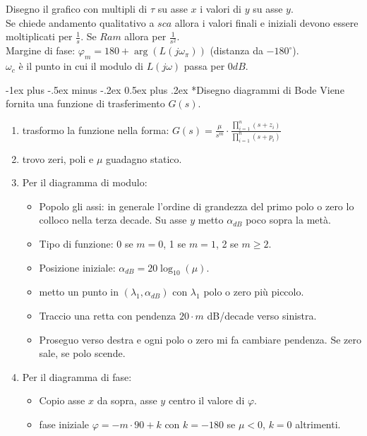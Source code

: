 \documentclass[10pt,landscape, a4paper]{scrartcl} %
\makeatletter
\renewcommand{\section}{\@startsection{section}{1}{0mm}%
                                {-1ex plus -.5ex minus -.2ex}%
                                {0.5ex plus .2ex}%
                                {\normalfont\large\bfseries}}
\makeatother
\begin{document}
\begin{multicols*}{3}
\begin{enumerate}
\end{enumerate}
Disegno il grafico con multipli di $\tau$ su asse $x$ i valori di $y$ su asse $y$.\\
Se chiede andamento qualitativo a $sca$ allora i valori finali e iniziali devono essere moltiplicati per $\frac{1}{s}$. Se $Ram$ allora per $\frac{1}{s^2}$.\\
Margine di fase: $\varphi_m = 180 + \arg(L(j\omega_\pi))$ (distanza da $-180^{\circ}$).\\
$\omega_c$ è il punto in cui il modulo di $L(j\omega)$ passa per $0 dB$.



\section*{Disegno diagrammi di Bode}
Viene fornita una funzione di trasferimento $G(s)$.
\begin{enumerate}
	\item trasformo la funzione nella forma: $G(s) = \frac{\mu}{s^m}\cdot \frac{\prod_{i=1}^{n} (s + z_i)}{\prod_{i=1}^{n} (s + p_i)}$
	\item trovo zeri, poli e $\mu$ guadagno statico.
	\item Per il diagramma di modulo:
		\begin{itemize}
			\item Popolo gli assi: in generale l'ordine di grandezza del primo polo o zero lo colloco nella terza decade. Su asse $y$ metto $\alpha_{dB}$ poco sopra la metà.
			\item Tipo di funzione: 0 se $m = 0$, 1 se $m = 1$, 2 se $m \geq 2$.
			\item Posizione iniziale: $\alpha_{dB} = 20\log_{10} (\mu)$.
			\item metto un punto in $(\lambda_1, \alpha_{dB})$ con $\lambda_1$ polo o zero più piccolo.
			\item Traccio una retta con pendenza $20\cdot m$ dB/decade verso sinistra.
			\item Proseguo verso destra e ogni polo o zero mi fa cambiare pendenza. Se zero sale, se polo scende.
		\end{itemize}
	\item Per il diagramma di fase:
		\begin{itemize}
			\item Copio asse $x$ da sopra, asse $y$ centro il valore di $\varphi$.
			\item fase iniziale $\varphi = - m \cdot 90 + k$ con $k = -180$ se $\mu < 0$, $k = 0$ altrimenti.

\end{itemize}
\end{enumerate}
\end{multicols*}
\end{document}
